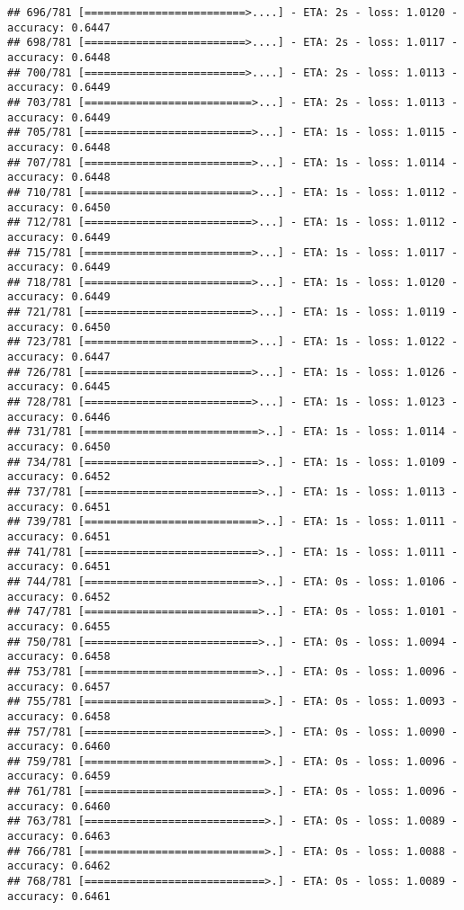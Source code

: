 \documentclass[
]{article}
\begin{document}
\begin{verbatim}
## 696/781 [=========================>....] - ETA: 2s - loss: 1.0120 - accuracy: 0.6447
## 698/781 [=========================>....] - ETA: 2s - loss: 1.0117 - accuracy: 0.6448
## 700/781 [=========================>....] - ETA: 2s - loss: 1.0113 - accuracy: 0.6449
## 703/781 [==========================>...] - ETA: 2s - loss: 1.0113 - accuracy: 0.6449
## 705/781 [==========================>...] - ETA: 1s - loss: 1.0115 - accuracy: 0.6448
## 707/781 [==========================>...] - ETA: 1s - loss: 1.0114 - accuracy: 0.6448
## 710/781 [==========================>...] - ETA: 1s - loss: 1.0112 - accuracy: 0.6450
## 712/781 [==========================>...] - ETA: 1s - loss: 1.0112 - accuracy: 0.6449
## 715/781 [==========================>...] - ETA: 1s - loss: 1.0117 - accuracy: 0.6449
## 718/781 [==========================>...] - ETA: 1s - loss: 1.0120 - accuracy: 0.6449
## 721/781 [==========================>...] - ETA: 1s - loss: 1.0119 - accuracy: 0.6450
## 723/781 [==========================>...] - ETA: 1s - loss: 1.0122 - accuracy: 0.6447
## 726/781 [==========================>...] - ETA: 1s - loss: 1.0126 - accuracy: 0.6445
## 728/781 [==========================>...] - ETA: 1s - loss: 1.0123 - accuracy: 0.6446
## 731/781 [===========================>..] - ETA: 1s - loss: 1.0114 - accuracy: 0.6450
## 734/781 [===========================>..] - ETA: 1s - loss: 1.0109 - accuracy: 0.6452
## 737/781 [===========================>..] - ETA: 1s - loss: 1.0113 - accuracy: 0.6451
## 739/781 [===========================>..] - ETA: 1s - loss: 1.0111 - accuracy: 0.6451
## 741/781 [===========================>..] - ETA: 1s - loss: 1.0111 - accuracy: 0.6451
## 744/781 [===========================>..] - ETA: 0s - loss: 1.0106 - accuracy: 0.6452
## 747/781 [===========================>..] - ETA: 0s - loss: 1.0101 - accuracy: 0.6455
## 750/781 [===========================>..] - ETA: 0s - loss: 1.0094 - accuracy: 0.6458
## 753/781 [===========================>..] - ETA: 0s - loss: 1.0096 - accuracy: 0.6457
## 755/781 [============================>.] - ETA: 0s - loss: 1.0093 - accuracy: 0.6458
## 757/781 [============================>.] - ETA: 0s - loss: 1.0090 - accuracy: 0.6460
## 759/781 [============================>.] - ETA: 0s - loss: 1.0096 - accuracy: 0.6459
## 761/781 [============================>.] - ETA: 0s - loss: 1.0096 - accuracy: 0.6460
## 763/781 [============================>.] - ETA: 0s - loss: 1.0089 - accuracy: 0.6463
## 766/781 [============================>.] - ETA: 0s - loss: 1.0088 - accuracy: 0.6462
## 768/781 [============================>.] - ETA: 0s - loss: 1.0089 - accuracy: 0.6461

\end{verbatim}
\end{document}
